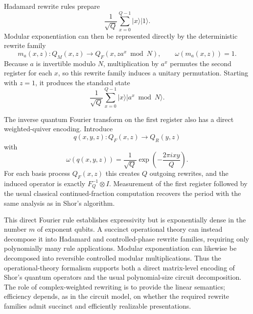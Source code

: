 \documentclass[10pt]{article}
\begin{document}
Hadamard rewrite rules prepare
\[
\frac{1}{\sqrt Q}\sum_{x=0}^{Q-1}|x\rangle|1\rangle.
\]
Modular exponentiation can then be represented directly by the deterministic
rewrite family
\[
m_a(x,z):
Q_M(x,z)\longrightarrow
Q_F(x,za^x\bmod N),
\qquad
\omega(m_a(x,z))=1.
\]
Because $a$ is invertible modulo $N$, multiplication by $a^x$ permutes the
second register for each $x$, so this rewrite family induces a unitary
permutation.  Starting with $z=1$, it produces the standard state
\[
\frac{1}{\sqrt Q}
\sum_{x=0}^{Q-1}|x\rangle|a^x\bmod N\rangle.
\]

The inverse quantum Fourier transform on the first register also has a direct
weighted-quiver encoding.  Introduce
\[
q(x,y,z):
Q_F(x,z)\longrightarrow Q_R(y,z)
\]
with
\[
\omega(q(x,y,z))
=
\frac{1}{\sqrt Q}
\exp\left(-\frac{2\pi ixy}{Q}\right).
\]
For each basis process $Q_F(x,z)$ this creates $Q$ outgoing rewrites, and the
induced operator is exactly $F_Q^{-1}\otimes I$.  Measurement of the first
register followed by the usual classical continued-fraction computation
recovers the period with the same analysis as in Shor's algorithm.

This direct Fourier rule establishes expressivity but is exponentially dense
in the number $m$ of exponent qubits.  A succinct operational theory can
instead decompose it into Hadamard and controlled-phase rewrite families,
requiring only polynomially many rule applications.  Modular exponentiation
can likewise be decomposed into reversible controlled modular multiplications.
Thus the operational-theory formalism supports both a direct matrix-level
encoding of Shor's quantum operators and the usual polynomial-size circuit
decomposition.  The role of complex-weighted rewriting is to provide the
linear semantics; efficiency depends, as in the circuit model, on whether the
required rewrite families admit succinct and efficiently realizable
presentations.
\end{document}
